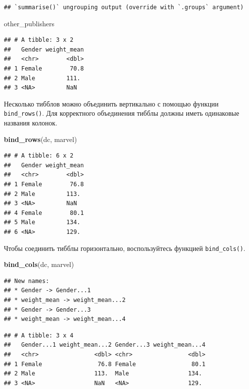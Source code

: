 \documentclass[
]{book}
\newenvironment{Shaded}{\begin{snugshade}}{\end{snugshade}}
\newcommand{\KeywordTok}[1]{\textcolor[rgb]{0.13,0.29,0.53}{\textbf{#1}}}
\newcommand{\NormalTok}[1]{#1}
\begin{document}
\begin{verbatim}
## `summarise()` ungrouping output (override with `.groups` argument)
\end{verbatim}

\begin{Shaded}
\begin{Highlighting}[]
\NormalTok{other_publishers}
\end{Highlighting}
\end{Shaded}

\begin{verbatim}
## # A tibble: 3 x 2
##   Gender weight_mean
##   <chr>        <dbl>
## 1 Female        70.8
## 2 Male         111. 
## 3 <NA>         NaN
\end{verbatim}

Несколько тибблов можно объединить вертикально с помощью функции \texttt{bind\_rows()}. Для корректного объединения тибблы должны иметь одинаковые названия колонок.

\begin{Shaded}
\begin{Highlighting}[]
\KeywordTok{bind_rows}\NormalTok{(dc, marvel)}
\end{Highlighting}
\end{Shaded}

\begin{verbatim}
## # A tibble: 6 x 2
##   Gender weight_mean
##   <chr>        <dbl>
## 1 Female        76.8
## 2 Male         113. 
## 3 <NA>         NaN  
## 4 Female        80.1
## 5 Male         134. 
## 6 <NA>         129.
\end{verbatim}

Чтобы соединить тибблы горизонтально, воспользуйтесь функцией \texttt{bind\_cols()}.

\begin{Shaded}
\begin{Highlighting}[]
\KeywordTok{bind_cols}\NormalTok{(dc, marvel)}
\end{Highlighting}
\end{Shaded}

\begin{verbatim}
## New names:
## * Gender -> Gender...1
## * weight_mean -> weight_mean...2
## * Gender -> Gender...3
## * weight_mean -> weight_mean...4
\end{verbatim}

\begin{verbatim}
## # A tibble: 3 x 4
##   Gender...1 weight_mean...2 Gender...3 weight_mean...4
##   <chr>                <dbl> <chr>                <dbl>
## 1 Female                76.8 Female                80.1
## 2 Male                 113.  Male                 134. 
## 3 <NA>                 NaN   <NA>                 129.
\end{verbatim}
\end{document}

